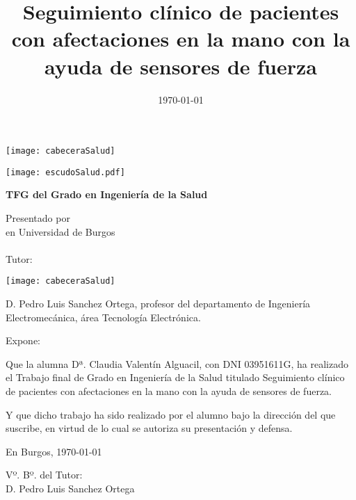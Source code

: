 \documentclass[a4paper,12pt,twoside]{memoir}
\title{Seguimiento clínico de pacientes con afectaciones en la mano con la ayuda de sensores de fuerza}
\author{\nombre}
\date{\today}
\makeatletter
\def\maketitle{
  \null
  \thispagestyle{empty}
\begin{center}
  \noindent\texttt{[image: cabeceraSalud]}\vspace{1.5cm}%
\end{center}
  
  \begin{center}
    \begin{minipage}[c][1.5cm][c]{.20\textwidth}
        \texttt{[image: escudoSalud.pdf]}
    \end{minipage}
  \end{center}
  
  \begin{center}
    \colorbox{cpardoBox}{%
        \begin{minipage}{.8\textwidth}
          \vspace{.5cm}\Large
          \begin{center}
          \textbf{TFG del Grado en Ingeniería de la Salud}\vspace{.6cm}\\
          \textbf{\LARGE\@title{}}
          \end{center}
          \vspace{.2cm}
        \end{minipage}
    }%
  \end{center}
  
  \begin{center}%
  {%
    \noindent\LARGE
    Presentado por \@author{}\\ 
    en Universidad de Burgos\\
    \vspace{0.5cm}
    \noindent\Large
    \@date{}\\
    \vspace{0.5cm}
    Tutor: \@tutor{}\\ 
  }%
  \end{center}%
  \null
  \cleardoublepage
  }
\newcommand{\nombre}{Claudia Valentín Alguacil}
\newcommand{\nombreTutor}{Pedro Luis Sanchez Ortega}
\newcommand{\dni}{03951611G}
\makeatother
\begin{document}
\maketitle


\newpage\null\thispagestyle{empty}\newpage

\thispagestyle{empty}


\noindent\texttt{[image: cabeceraSalud]}\vspace{1cm}

\noindent D. \nombreTutor, profesor del departamento de Ingeniería Electromecánica, área Tecnología Electrónica.

\noindent Expone:

\noindent Que la alumna Dª. \nombre, con DNI \dni, ha realizado el Trabajo final de Grado en Ingeniería de la Salud titulado Seguimiento clínico de pacientes con afectaciones en la mano con la ayuda de sensores de fuerza. 

\noindent Y que dicho trabajo ha sido realizado por el alumno bajo la dirección del que suscribe, en virtud de lo cual se autoriza su presentación y defensa.

\begin{center} %
En Burgos, {\large \today}
\end{center}

\vfill\vfill\vfill

\begin{minipage}{0.45\textwidth}
\begin{flushleft} %
Vº. Bº. del Tutor:\\[2cm]
D. \nombreTutor
\end{flushleft}
\end{minipage}
\hfill
\begin{minipage}{0.45\textwidth}
\begin{flushleft} %
\end{flushleft}
\end{minipage}
\hfill

\vfill



\newpage\null\thispagestyle{empty}\newpage
\end{document}
